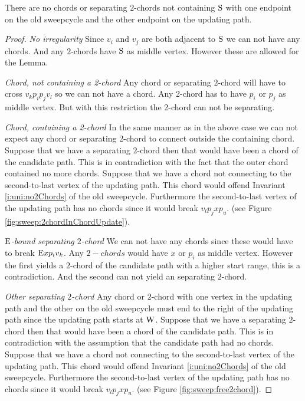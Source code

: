     \begin{lemma}
      \label{lm:sweep:noConnectingIregularity}
      There are no chords or separating $2$-chords not containing $\mathrm{S}$ with one endpoint on the old sweepcycle and the other endpoint on the updating path.
    \end{lemma}

    \begin{proof}
      \emph{No irregularity}
      Since $v_i$ and $v_j$ are both adjacent to $\mathrm{S}$ we can not have any chords. And any $2$-chords have $\mathrm{S}$ as middle vertex. However these are allowed for the Lemma.

      \emph{Chord, not containing a 2-chord}
      Any chord or separating $2$-chord will have to cross $v_k p_i p_j v_l$ so we can not have a chord. Any 2-chord has to have $p_i$ or $p_j$ as middle vertex. But with this restriction the 2-chord can not be separating.

      \emph{Chord, containing a 2-chord}
      In the same manner as in the above case we can not expect any chord or separating 2-chord to connect outside the containing chord.
      Suppose that we have a separating $2$-chord then that would have been a chord of the candidate path. This is in contradiction with the fact that the outer chord contained no more chords.
      Suppose that we have a chord not connecting to the second-to-last vertex of the updating path. This chord would offend Invariant \ref{i:uni:no2Chords} of the old sweepcycle. Furthermore the second-to-last vertex of the updating path has no chords since it would break $v_l p_j x p_u$. (see Figure \ref{fig:sweep:2chordInChordUpdate}).

      \emph{$\mathrm{E}$-bound separating $2$-chord}
      We can not have any chords since these would have to break $\mathrm{E} x p_i v_k$. Any $2-chords$ would have $x$ or $p_i$ as middle vertex. However the first yields a $2$-chord of the candidate path with a higher start range, this is a contradiction. And the second can not yield an separating $2$-chord.


      \emph{Other separating $2$-chord}
      Any chord or $2$-chord with one vertex in the updating path and the other on the old sweepcycle must end to the right of the updating path since the updating path starts at $\mathrm{W}$.
      Suppose that we have a separating $2$-chord then that would have been a chord of the candidate path. This is in contradiction with the assumption that the candidate path had no chords.
      Suppose that we have a chord not connecting to the second-to-last vertex of the updating path. This chord would offend Invariant \ref{i:uni:no2Chords} of the old sweepcycle. Furthermore the second-to-last vertex of the updating path has no chords since it would break $v_l p_j x p_u$. (see Figure \ref{fig:sweep:free2chord}).
    \end{proof}


